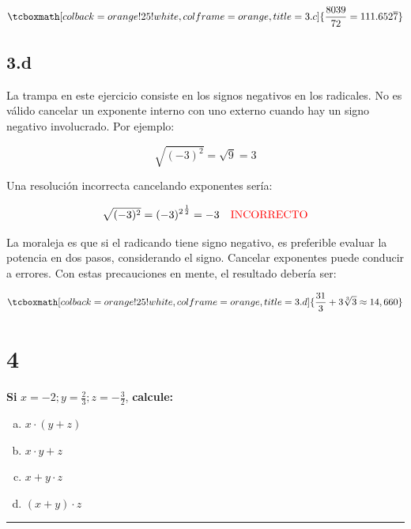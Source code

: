 \documentclass{article}
\newcommand{\hresult}[2]{\tcboxmath[colback=orange!25!white,colframe=orange, title=#1] {#2} }
\begin{document}
\begin{equation}
\hresult{3.c} { \frac{8039}{72} = 111.652\overline{7} }
\end{equation}

\subsection*{3.d}
\label{subsec:3.d}

La trampa en este ejercicio consiste en los signos negativos en los radicales. No es válido cancelar un exponente interno con uno externo cuando hay un signo negativo involucrado. Por ejemplo:

\begin{equation}
\sqrt{(-3)^2} = \sqrt{9} = 3
\end{equation}

Una resolución incorrecta cancelando exponentes sería:

\begin{equation}
\sqrt{(-3)^2} = {(-3)^2}^{\frac{1}{2}} = -3 \quad \textcolor{red}{\text{INCORRECTO}}
\end{equation}

La moraleja es que si el radicando tiene signo negativo, es preferible evaluar la potencia en dos pasos, considerando el signo. Cancelar exponentes puede conducir a errores. Con estas precauciones en mente, el resultado debería ser:

\begin{equation}
\hresult{3.d} { \frac{31}{3} + 3 \sqrt[3]{3} \approx 14,660 }
\end{equation}

\section*{4}
\label{sec:4}

\textbf{Si } $x = -2; y = \frac{2}{3}; z = -\frac{3}{2}$, \textbf{calcule:}

\begin{enumerate}[(a)]
\bfseries

\item $ x \cdot (y + z) $

\item $ x \cdot y + z $

\item $ x + y \cdot z $

\item $ (x + y) \cdot z $

\end{enumerate}
\hrule
\end{document}
